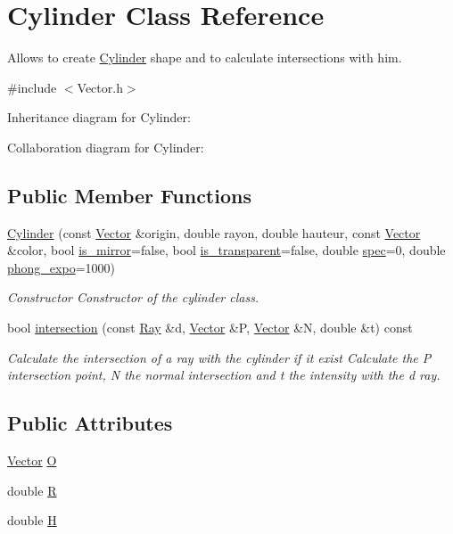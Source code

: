 \hypertarget{classCylinder}{}\section{Cylinder Class Reference}
\label{classCylinder}


Allows to create \hyperlink{classCylinder}{Cylinder} shape and to calculate intersections with him.  




{\ttfamily \#include $<$Vector.\+h$>$}



Inheritance diagram for Cylinder\+:


Collaboration diagram for Cylinder\+:
\subsection*{Public Member Functions}
\begin{DoxyCompactItemize}
\item 
\hyperlink{classCylinder_a54ef9e82a556bb980a2147fbee3612b3}{Cylinder} (const \hyperlink{classVector}{Vector} \&origin, double rayon, double hauteur, const \hyperlink{classVector}{Vector} \&color, bool \hyperlink{classShape_a0ead7657fa5e4c7862fe1cedd670a9e5}{is\+\_\+mirror}=false, bool \hyperlink{classShape_ab8da3fc4606e66dea941ec23d25f53ef}{is\+\_\+transparent}=false, double \hyperlink{classShape_a60ef96ac5dea3478fdd1ab320e4c3bef}{spec}=0, double \hyperlink{classShape_a2556fca106f9503e6dfb4da703c28f7f}{phong\+\_\+expo}=1000)
\begin{DoxyCompactList}\small\item\em Constructor Constructor of the cylinder class. \end{DoxyCompactList}\item 
bool \hyperlink{classCylinder_a0f3c6cca45e3efa5250dc45ebcff81e5}{intersection} (const \hyperlink{classRay}{Ray} \&d, \hyperlink{classVector}{Vector} \&P, \hyperlink{classVector}{Vector} \&N, double \&t) const
\begin{DoxyCompactList}\small\item\em Calculate the intersection of a ray with the cylinder if it exist Calculate the P intersection point, N the normal intersection and t the intensity with the d ray. \end{DoxyCompactList}\end{DoxyCompactItemize}
\subsection*{Public Attributes}
\begin{DoxyCompactItemize}
\item 
\hyperlink{classVector}{Vector} \hyperlink{classCylinder_a3093b8b66a4194d086cbb6cf700bc32a}{O}
\item 
double \hyperlink{classCylinder_a8f4587554355f2a79614f639034f8aaf}{R}
\item 
double \hyperlink{classCylinder_a5774701442d53c43081cae48bd99147c}{H}
\end{DoxyCompactItemize}


